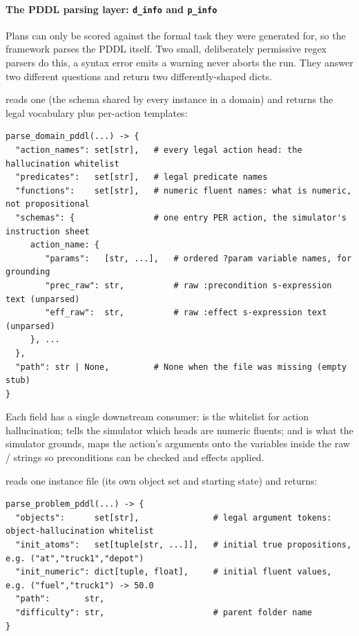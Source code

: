 \paragraph{The PDDL parsing layer: \texorpdfstring{\texttt{d\_info}}{d\_info} and \texorpdfstring{\texttt{p\_info}}{p\_info}}

Plans can only be scored against the formal task they were generated for, so the
framework parses the PDDL itself. Two small, deliberately permissive regex
parsers do this, a syntax error emits a warning never aborts the run. They
answer two different questions and return two differently-shaped dicts.

 reads one  (the schema
shared by every instance in a domain) and returns the legal vocabulary plus
per-action templates:

\begin{lstlisting}
parse_domain_pddl(...) -> {
  "action_names": set[str],   # every legal action head: the hallucination whitelist
  "predicates":   set[str],   # legal predicate names
  "functions":    set[str],   # numeric fluent names: what is numeric, not propositional
  "schemas": {                # one entry PER action, the simulator's instruction sheet
     action_name: {
        "params":   [str, ...],   # ordered ?param variable names, for grounding
        "prec_raw": str,          # raw :precondition s-expression text (unparsed)
        "eff_raw":  str,          # raw :effect s-expression text (unparsed)
     }, ...
  },
  "path": str | None,         # None when the file was missing (empty stub)
}
\end{lstlisting}

Each field has a single downstream consumer:  is the
whitelist for action hallucination;  tells the simulator which
heads are numeric fluents; and  is what the simulator grounds, 
 maps the action's arguments onto the variables inside the raw
/ strings so preconditions can be checked and
effects applied.

 reads one instance file (its own object
set and starting state) and returns:

\begin{lstlisting}
parse_problem_pddl(...) -> {
  "objects":      set[str],               # legal argument tokens: object-hallucination whitelist
  "init_atoms":   set[tuple[str, ...]],   # initial true propositions, e.g. ("at","truck1","depot")
  "init_numeric": dict[tuple, float],     # initial fluent values, e.g. ("fuel","truck1") -> 50.0
  "path":       str,
  "difficulty": str,                      # parent folder name
}
\end{lstlisting}

